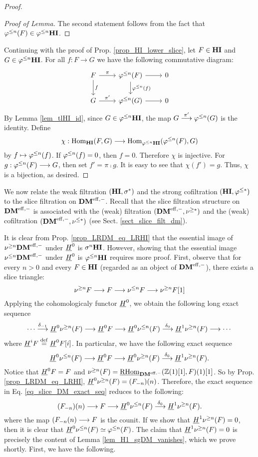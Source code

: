 \begin{proof}
\begin{proof}[Proof of Lemma]
The second statement follows from the fact that $\tlHI{n}(F) \in 
\tlHI{n}\HI$.
\end{proof}

Continuing with the proof of Prop. \ref{prop_HI_lower_slice}, let
$F \in \HI$ and $G \in \tlHI{n}\HI$. For all $f: F \to G$ we have 
the following commutative diagram:
\[
\begin{tikzcd}
F \arrow{r}{\pi} \arrow{d}{f}
& \tlHI{n}(F) \arrow{r} \arrow{d}{\tlHI{n}(f)}
& 0 \\
G \arrow{r}{\pi'}
& \tlHI{n}(G) \arrow{r}
& 0
\end{tikzcd}
\]
By Lemma \ref{lem_tlHI_id}, since $G \in \tlHI{n}\HI$, the map
$G \stackrel{\pi'}{\to} \tlHI{n}(G)$ is the identity. Define
\[
\chi : \homHI(F, G) \to \hom_{\tlHI{n}\HI}(\tlHI{n}(F), G)
\]
by $f \mapsto \tlHI{n}(f)$. If $\tlHI{n}(f) = 0$, then $f = 0$.
Therefore $\chi$ is injective. For $g: \tlHI{n}(F) \to G$, then
set $f' = \pi \comp g$. It is easy to see that $\chi(f') = g$.
Thus, $\chi$ is a bijection, as desired.
\end{proof}

We now relate the weak filtration $(\HI, \sgHI{*})$ and the strong 
cofiltration $(\HI, \tlHI{*})$ to the slice filtration on 
$\DMeff$. Recall that the slice filtration structure on $\DMeff$ 
is associated with the (weak) filtration $(\DMeff, \sgDM{*})$ and 
the (weak) cofiltration $(\DMeff, \slDM{*})$ (see Sect. 
\ref{sect_slice_filt_dm}).

It is clear from Prop. \ref{prop_LRDM_eq_LRHI} that the essential 
image of $\sgDM{n}\DMeff$ under $\sheaf{H}^0$ is $\sgHI{n}\HI$. 
However, showing that the essential image $\slDM{n}\DMeff$ under 
$\sheaf{H}^0$ is $\tlHI{n}\HI$ requires more proof. 
First, observe that for every $n > 0$ and every $F \in \HI$ 
(regarded as an object of $\DMeff$), there exists a slice 
triangle:
\[
\sliceTriangle{n}{F}
\]
Applying the cohomologicaly functor $\sheaf{H}^0$, we obtain the
following long exact sequence
\[
\cdots \stackrel{\delta_{-1}}{\to} \sheaf{H}^0 \sgDM{n}(F) \to 
   \sheaf{H}^0 F \to \sheaf{H}^0 \slDM{n}(F)
   \stackrel{\delta_0}{\to} \sheaf{H}^1 \sgDM{n}(F) \to \cdots
\]
where $\sheaf{H}^i F \defeq \sheaf{H}^0F[i]$. In particular, we
have the following exact sequence
\begin{equation}\label{eq_slice_DM_exact_seq}
\sheaf{H}^0 \slDM{n}(F) \to \sheaf{H}^0 F \to \sheaf{H}^0 
\sgDM{n}(F) \stackrel{\delta_0}{\to} \sheaf{H}^1 \sgDM{n}(F).
\end{equation}
Notice that $\sheaf{H}^0F = F$ and $\sgDM{n}(F) = 
\ihomDMf(\Z(1)[1], F)(1)[1]$. So by Prop. \ref{prop_LRDM_eq_LRHI}, 
$\sheaf{H}^0 \sgDM{n}(F) = \LHI[n]{(\RHI[n]{F})}$. Therefore, the 
exact sequence in Eq. \ref{eq_slice_DM_exact_seq} reduces to the 
following:
\[
\LHI[n]{(\RHI[n]{F})} \to F \to \sheaf{H}^0{\slDM{n}(F)} 
   \stackrel{\delta_0}{\to} \sheaf{H}^1 \sgDM{n}(F).
\]
where the map $\LHI[n]{(\RHI[n]{F}} \to F$ is the counit. If we 
show that $\sheaf{H}^1 \sgDM{n}(F) = 0$, then it is clear that
$\sheaf{H}^0 \slDM{n}(F) \simeq \tlHI{n}(F)$. The claim that 
$\sheaf{H}^1 \sgDM{n}(F) = 0$ is precisely the content of Lemma 
\ref{lem_H1_sgDM_vanishes}, which we prove shortly. First, we have
the following.


